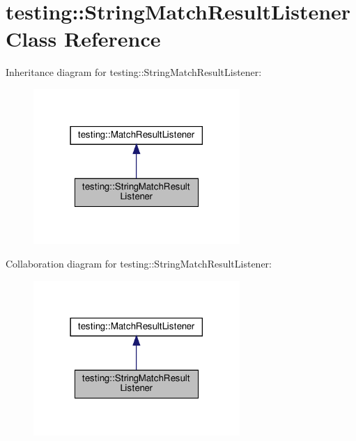 \hypertarget{classtesting_1_1_string_match_result_listener}{}\section{testing\+:\+:String\+Match\+Result\+Listener Class Reference}
\label{classtesting_1_1_string_match_result_listener}


Inheritance diagram for testing\+:\+:String\+Match\+Result\+Listener\+:
\nopagebreak
\begin{figure}[H]
\begin{center}
\leavevmode
\includegraphics[width=222pt]{classtesting_1_1_string_match_result_listener__inherit__graph}
\end{center}
\end{figure}


Collaboration diagram for testing\+:\+:String\+Match\+Result\+Listener\+:
\nopagebreak
\begin{figure}[H]
\begin{center}
\leavevmode
\includegraphics[width=222pt]{classtesting_1_1_string_match_result_listener__coll__graph}
\end{center}
\end{figure}
